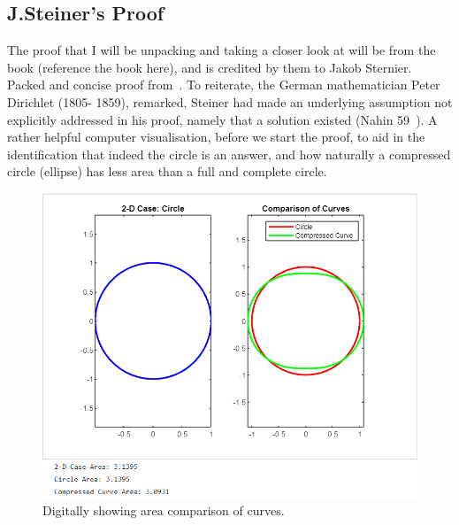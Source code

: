 \documentclass[a4paper]{book}
\numberwithin{theorem}{section}%
\begin{document}
\subsection{J.Steiner's Proof}
The proof that I will be unpacking and taking a closer look at will be from the book (reference the book here), and is credited by them to Jakob Sternier. Packed and concise proof from~\citep{gluck2012isoperimetric}. To reiterate, the German mathematician Peter Dirichlet (1805- 1859), remarked, Steiner had made an underlying assumption not explicitly addressed in his proof, namely that a solution existed (Nahin 59~\citep{nahin2021least}). A rather helpful computer visualisation, before we start the proof, to aid in the identification that indeed the circle is an answer, and how naturally a compressed circle (ellipse) has less area than a full and complete circle.
\begin{figure}[hbt!]
    \begin{center}   
        \includegraphics[width=120mm]{steinerproofvisualisation}
        \caption{Digitally showing area comparison of curves.}
    \end{center}
\end{figure}
\end{document}
